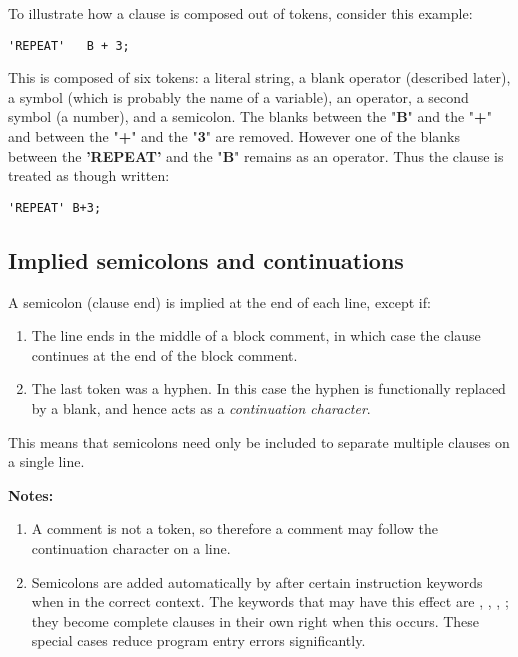  To illustrate how a clause is composed out of tokens, consider this
example:
\begin{lstlisting}
'REPEAT'   B + 3;
\end{lstlisting}
This is composed of six tokens: a literal string, a blank operator
(described later), a symbol (which is probably the name of a variable),
an operator, a second symbol (a number), and a semicolon.
The blanks between the "\textbf{B}" and the "\textbf{+}"
and between the "\textbf{+}" and the "\textbf{3}" are
removed.
However one of the blanks between the \textbf{'REPEAT'} and the
"\textbf{B}" remains as an operator.
Thus the clause is treated as though written:
\begin{lstlisting}
'REPEAT' B+3;
\end{lstlisting}
\subsection{Implied semicolons and continuations}\label{refsemis}
 A semicolon (clause end) is implied at the end of each line, except
if:
\begin{enumerate}
\item The line ends in the middle of a block comment, in which case the
clause continues at the end of the block comment.
\item The last token was a hyphen.
In this case the hyphen is functionally replaced by a blank, and hence
acts as a \emph{continuation character}.
\end{enumerate}
 This means that semicolons need only be included to separate
multiple clauses on a single line.
\begin{shaded}\noindent
\textbf{Notes:}
\begin{enumerate}
\item A comment is not a token, so therefore a comment may follow the
continuation character on a line.
\item Semicolons are added automatically by \nr{} after certain
instruction keywords when in the correct context.
The keywords that may have this effect are ,
, , ; they become
complete clauses in their own right when this occurs.
These special cases reduce program entry errors significantly.
\end{enumerate}
\end{shaded}\indent
